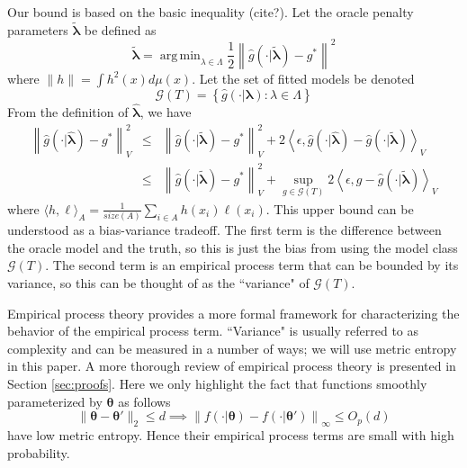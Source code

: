 \documentclass[12pt]{article}
\DeclareMathOperator*{\argmin}{arg\,min}
\begin{document}
Our bound is based on the basic inequality (cite?). Let the oracle penalty parameters $\tilde{\boldsymbol \lambda}$ be defined as
\begin{equation}
\tilde{\boldsymbol \lambda} = \argmin_{\lambda \in \Lambda} \frac{1}{2} \left \| \hat{g}(\cdot | \tilde{\boldsymbol \lambda}) - g^* \right \|^2
\end{equation}
where $\| h \| = \int h^2(x) d\mu(x)$. Let the set of fitted models be denoted
\begin{equation}
\label{function_class_GT}
\mathcal{G}(T) = \left \{ \hat{g}(\cdot | \boldsymbol \lambda) : \lambda \in \Lambda  \right \}
\end{equation}
From the definition of $\hat{\boldsymbol \lambda}$, we have
\begin{eqnarray}
\label{basic_ineq}
\left \|\hat{g}(\cdot | \hat{\boldsymbol \lambda}) - g^* \right \|_V^2
& \le &
\left \| \hat{g}(\cdot | \tilde{\boldsymbol \lambda}) - g^* \right \|_V^2 + 
2 \left \langle \epsilon, \hat{g}(\cdot | \hat{\boldsymbol \lambda}) - \hat{g}(\cdot | \tilde{\boldsymbol \lambda}) \right \rangle_V \\
& \le &
\left \| \hat{g}(\cdot | \tilde{\boldsymbol \lambda}) - g^* \right \|_V^2 + 
\sup_{g \in \mathcal{G}(T)} 2 \left \langle \epsilon, g - \hat{g}(\cdot | \tilde{\boldsymbol \lambda}) \right \rangle_V
\end{eqnarray}
where $\langle h, \ell \rangle_A = \frac{1}{size(A)}\sum_{i\in A} h(x_i) \ell(x_i)$. This upper bound can be understood as a bias-variance tradeoff. The first term is the difference between the oracle model and the truth, so this is just the bias from using the model class $\mathcal{G}(T)$. The second term is an empirical process term that can be bounded by its variance, so this can be thought of as the ``variance" of $\mathcal{G}(T)$.

Empirical process theory provides a more formal framework for characterizing the behavior of the empirical process term. ``Variance" is usually referred to as complexity and can be measured in a number of ways; we will use metric entropy in this paper. A more thorough review of empirical process theory is presented in Section \ref{sec:proofs}. Here we only highlight the fact that functions smoothly parameterized by $\boldsymbol \theta$ as follows
\begin{equation}
\| \boldsymbol \theta - \boldsymbol \theta' \|_2 \le d \implies \left \| f(\cdot | \boldsymbol \theta) - f(\cdot | \boldsymbol \theta') \right \|_\infty \le O_p(d)
\end{equation}
have low metric entropy. Hence their empirical process terms are small with high probability.
\end{document}
